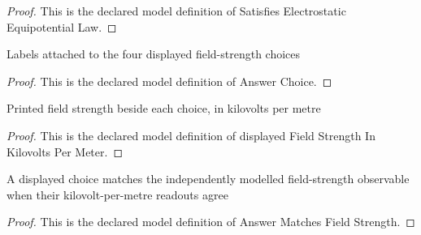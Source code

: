 \begin{proof}
  This is the declared model definition of Satisfies Electrostatic Equipotential Law.
\end{proof}
\begin{definition}
  \label{def:physics:phyx-mini-0870:phyxminiproblems-problemphyxmini0870-answerchoice}
  Labels attached to the four displayed field-strength choices
\end{definition}
\begin{proof}
  This is the declared model definition of Answer Choice.
\end{proof}
\begin{definition}
  \label{def:physics:phyx-mini-0870:phyxminiproblems-problemphyxmini0870-displayedfieldstrengthinkilovoltspermeter}
  Printed field strength beside each choice, in kilovolts per metre
\end{definition}
\begin{proof}
  This is the declared model definition of displayed Field Strength In Kilovolts Per Meter.
\end{proof}
\begin{definition}
  \label{def:physics:phyx-mini-0870:phyxminiproblems-problemphyxmini0870-answermatchesfieldstrength}
  A displayed choice matches the independently modelled field-strength observable when their kilovolt-per-metre readouts agree
\end{definition}
\begin{proof}
  This is the declared model definition of Answer Matches Field Strength.
\end{proof}
